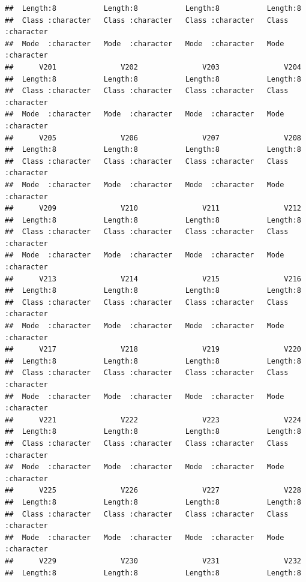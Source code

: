 \documentclass[
]{article}
\begin{document}
\begin{verbatim}
##  Length:8           Length:8           Length:8           Length:8          
##  Class :character   Class :character   Class :character   Class :character  
##  Mode  :character   Mode  :character   Mode  :character   Mode  :character  
##      V201               V202               V203               V204          
##  Length:8           Length:8           Length:8           Length:8          
##  Class :character   Class :character   Class :character   Class :character  
##  Mode  :character   Mode  :character   Mode  :character   Mode  :character  
##      V205               V206               V207               V208          
##  Length:8           Length:8           Length:8           Length:8          
##  Class :character   Class :character   Class :character   Class :character  
##  Mode  :character   Mode  :character   Mode  :character   Mode  :character  
##      V209               V210               V211               V212          
##  Length:8           Length:8           Length:8           Length:8          
##  Class :character   Class :character   Class :character   Class :character  
##  Mode  :character   Mode  :character   Mode  :character   Mode  :character  
##      V213               V214               V215               V216          
##  Length:8           Length:8           Length:8           Length:8          
##  Class :character   Class :character   Class :character   Class :character  
##  Mode  :character   Mode  :character   Mode  :character   Mode  :character  
##      V217               V218               V219               V220          
##  Length:8           Length:8           Length:8           Length:8          
##  Class :character   Class :character   Class :character   Class :character  
##  Mode  :character   Mode  :character   Mode  :character   Mode  :character  
##      V221               V222               V223               V224          
##  Length:8           Length:8           Length:8           Length:8          
##  Class :character   Class :character   Class :character   Class :character  
##  Mode  :character   Mode  :character   Mode  :character   Mode  :character  
##      V225               V226               V227               V228          
##  Length:8           Length:8           Length:8           Length:8          
##  Class :character   Class :character   Class :character   Class :character  
##  Mode  :character   Mode  :character   Mode  :character   Mode  :character  
##      V229               V230               V231               V232          
##  Length:8           Length:8           Length:8           Length:8          

\end{verbatim}
\end{document}
